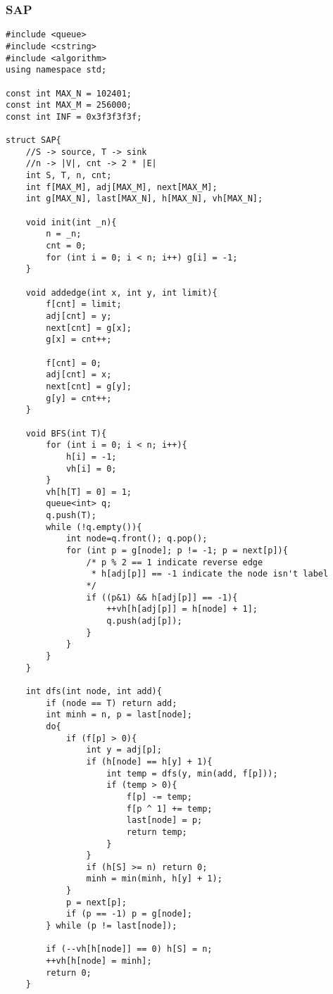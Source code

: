 \subsubsection{SAP}
\begin{verbatim}
#include <queue>
#include <cstring>
#include <algorithm>
using namespace std;

const int MAX_N = 102401;
const int MAX_M = 256000;
const int INF = 0x3f3f3f3f;

struct SAP{
    //S -> source, T -> sink 
    //n -> |V|, cnt -> 2 * |E|
    int S, T, n, cnt;
    int f[MAX_M], adj[MAX_M], next[MAX_M];
    int g[MAX_N], last[MAX_N], h[MAX_N], vh[MAX_N];

    void init(int _n){
        n = _n;
        cnt = 0;
        for (int i = 0; i < n; i++) g[i] = -1;
    }

    void addedge(int x, int y, int limit){
        f[cnt] = limit;
        adj[cnt] = y;
        next[cnt] = g[x];
        g[x] = cnt++;

        f[cnt] = 0;
        adj[cnt] = x;
        next[cnt] = g[y];
        g[y] = cnt++;
    }

    void BFS(int T){
        for (int i = 0; i < n; i++){
            h[i] = -1;
            vh[i] = 0;
        }
        vh[h[T] = 0] = 1;
        queue<int> q;
        q.push(T);
        while (!q.empty()){
            int node=q.front(); q.pop();
            for (int p = g[node]; p != -1; p = next[p]){
                /* p % 2 == 1 indicate reverse edge
                 * h[adj[p]] == -1 indicate the node isn't label
                */
                if ((p&1) && h[adj[p]] == -1){ 
                    ++vh[h[adj[p]] = h[node] + 1];
                    q.push(adj[p]);
                }
            }
        }
    }

    int dfs(int node, int add){
        if (node == T) return add;
        int minh = n, p = last[node];
        do{
            if (f[p] > 0){
                int y = adj[p];
                if (h[node] == h[y] + 1){
                    int temp = dfs(y, min(add, f[p]));
                    if (temp > 0){
                        f[p] -= temp;
                        f[p ^ 1] += temp;
                        last[node] = p;
                        return temp;
                    }
                }
                if (h[S] >= n) return 0;
                minh = min(minh, h[y] + 1);
            }
            p = next[p];
            if (p == -1) p = g[node];
        } while (p != last[node]);

        if (--vh[h[node]] == 0) h[S] = n;
        ++vh[h[node] = minh];
        return 0;
    }


\end{verbatim}
